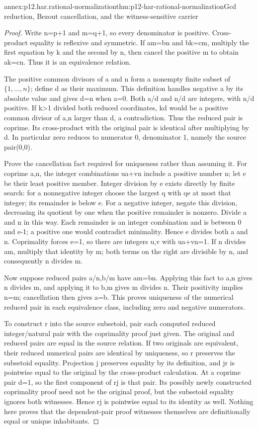 \begin{annexitem}{annex:p12.har.rational-normalization}{thm:p12-har-rational-normalization}{Gcd reduction, Bezout cancellation, and the witness-sensitive carrier}
\begin{proof}
Write n=p+1 and m=q+1, so every denominator is positive. Cross-product
equality is reflexive and symmetric. If am=bn and bk=cm, multiply
the first equation by k and the second by n, then cancel the positive
m to obtain ak=cn. Thus it is an equivalence relation.

The positive common divisors of a and n form a nonempty finite subset
of \(\{1,\ldots,n\}\); define d as their maximum. This definition
handles negative a by its absolute value and gives d=n when a=0.
Both a/d and n/d are integers, with n/d positive. If k>1 divided
both reduced coordinates, kd would be a positive common divisor of
a,n larger than d, a contradiction. Thus the reduced pair is coprime.
Its cross-product with the original pair is identical after multiplying
by d. In particular zero reduces to numerator 0, denominator 1, namely
the source pair(0,0).

Prove the cancellation fact required for uniqueness rather than assuming
it. For coprime a,n, the integer combinations ua+vn include a positive
number n; let e be their least positive member. Integer division by e
exists directly by finite search: for a nonnegative integer choose the
largest q with qe at most that integer; its remainder is below e.
For a negative integer, negate this division, decreasing its quotient
by one when the positive remainder is nonzero. Divide a and n in
this way. Each remainder is an integer combination and is between 0
and e-1; a positive one would contradict minimality. Hence e divides
both a and n. Coprimality forces e=1, so there are integers u,v with
ua+vn=1. If n divides am, multiply that identity by m; both terms
on the right are divisible by n, and consequently n divides m.

Now suppose reduced pairs a/n,b/m have am=bn. Applying this fact
to a,n gives n divides m, and applying it to b,m gives m divides n.
Their positivity implies n=m; cancellation then gives a=b. This
proves uniqueness of the numerical reduced pair in each equivalence
class, including zero and negative numerators.

To construct r into the source subsetoid, pair each computed reduced
integer/natural pair with the coprimality proof just given. The original
and reduced pairs are equal in the source relation. If two originals
are equivalent, their reduced numerical pairs are identical by uniqueness,
so r preserves the subsetoid equality. Projection j preserves equality
by its definition, and jr is pointwise equal to the original by the
cross-product calculation. At a coprime pair d=1, so the first component
of rj is that pair. Its possibly newly constructed coprimality proof
need not be the original proof, but the subsetoid equality ignores both
witnesses. Hence rj is pointwise equal to its identity as well.
Nothing here proves that the dependent-pair proof witnesses themselves
are definitionally equal or unique inhabitants.
\end{proof}
\end{annexitem}

